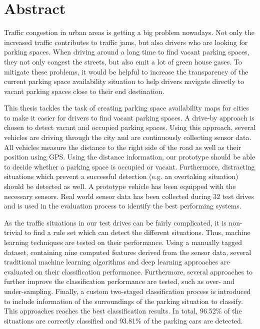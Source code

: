 

\chapter*{Abstract}

Traffic congestion in urban areas is getting a big problem nowadays. Not only the increased traffic contributes to traffic jams, but also drivers who are looking for parking spaces. When driving around a long time to find vacant parking spaces, they not only congest the streets, but also emit a lot of green house gases.
To mitigate these problems, it would be helpful to increase the transparency of the current parking space availability situation to help drivers navigate directly to vacant parking spaces close to their end destination. 

This thesis tackles the task of creating parking space availability maps for cities to make it easier for drivers to find vacant parking spaces. A drive-by approach is chosen to detect vacant and occupied parking spaces. 
Using this approach, several vehicles are driving through the city and are continuously collecting sensor data. All vehicles measure the distance to the right side of the road as well as their position using GPS. Using the distance information, our prototype should be able to decide whether a parking space is occupied or vacant. Furthermore, distracting situations which prevent a successful detection (e.g. an overtaking situation) should be detected as well. 
A prototype vehicle has been equipped with the necessary sensors. Real world sensor data has been collected during 32 test drives and is used in the evaluation process to identify the best performing systems.

As the traffic situations in our test drives can be fairly complicated, it is non-trivial to find a rule set which can detect the different situations. Thus, machine learning techniques are tested on their performance. Using a manually tagged dataset, containing nine computed features derived from the sensor data, several traditional machine learning algorithms and deep learning approaches are evaluated on their classification performance. Furthermore, several approaches to further improve the classification performance are tested, such as over- and under-sampling. 
Finally, a custom two-staged classification process is introduced to include information of the surroundings of the parking situation to classify. This approaches reaches the best classification results. In total, 96.52\% of the situations are correctly classified and 93.81\% of the parking cars are detected.


